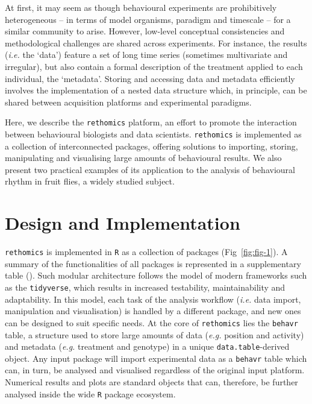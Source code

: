 \documentclass[10pt,letterpaper]{article}\usepackage[]{graphicx}\usepackage[]{color}
\begin{document}
At first, it may seem as though behavioural experiments are prohibitively heterogeneous -- in terms of model organisms, paradigm and timescale -- for a similar community to arise.
However, low-level conceptual consistencies and methodological challenges are shared across experiments.
For instance, the results (\emph{i.e.} the `data')  feature a set of long time series (sometimes multivariate and irregular), but also contain a formal description of the treatment applied to each individual, the `metadata'.
Storing and accessing data and metadata efficiently involves the implementation of a nested data structure which, in principle,
can be shared between acquisition platforms and experimental paradigms.

Here, we describe the \texttt{rethomics} platform, an effort to promote the interaction between behavioural biologists and data scientists.
\texttt{rethomics} is implemented as a collection of interconnected packages, offering solutions to importing, storing, manipulating and visualising large amounts of behavioural results.
We also present two practical examples of its application to the analysis of behavioural rhythm in fruit flies, a widely studied subject.


\section*{Design and Implementation}
\texttt{rethomics} is implemented in \texttt{R}\cite{r_core_team_r_2017}
as a collection of packages (Fig~\ref{fig:fig-1}).
A summary of the functionalities of all packages is represented in a supplementary table ().
Such modular architecture follows the model of modern frameworks such as the \texttt{tidyverse}\cite{wickham_tidyverse_2017}, which results in increased testability, maintainability and adaptability.
In this model, each task of the analysis workflow (\emph{i.e.} data import, manipulation and visualisation) is handled by a different package, and new ones can be designed to suit specific needs.
At the core of \texttt{rethomics} lies the \texttt{behavr} table, a structure used to store large amounts of data (\emph{e.g.} position and activity) and metadata (\emph{e.g.} treatment and genotype) in a unique \texttt{data.table}-derived object\cite{dowle_data.table_2017}.
Any input package will import experimental data as a \texttt{behavr} table which can, in turn, be analysed and visualised regardless of the original input platform.
Numerical results and plots are standard objects that can, therefore, be further analysed inside the wide \texttt{R} package ecosystem.
\end{document}
